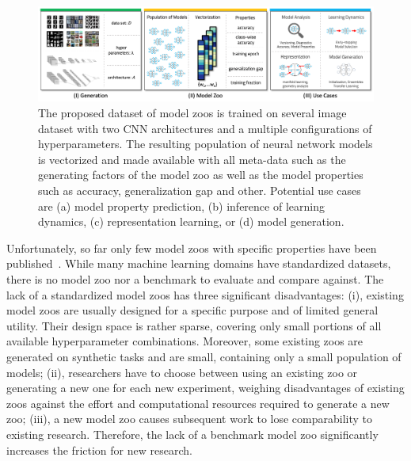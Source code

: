 \begin{figure}[t]
\begin{minipage}[t]{1.0\textwidth}
\begin{center}
\includegraphics[trim=0in 0in 0in 0in, clip, width=1.0\linewidth]{imgs/model_zoo_overview_v2.png}
\vskip -0.1in
\caption{\small The proposed dataset of model zoos is trained on several image dataset with two CNN architectures and a multiple configurations of hyperparameters. The resulting population of neural network models is vectorized and made available with all meta-data such as the generating factors of the model zoo as well as the model properties such as accuracy, generalization gap and other. Potential use cases are (a) model property prediction, (b) inference of learning dynamics, (c) representation learning, or (d) model generation.
}
\label{fig:overview}    
\end{center}
\end{minipage}
\end{figure}


%
%
Unfortunately, so far only few model zoos with specific properties have been published~\citep{unterthinerPredictingNeuralNetwork2020,eilertsenClassifyingClassifierDissecting2020, suchAtariModelZoo2019, schurholtSelfSupervisedRepresentationLearning2021}. While many machine learning domains have standardized datasets, there is no model zoo nor a benchmark to evaluate and compare against.
%
The lack of a standardized model zoos has three significant disadvantages: 
(i), existing model zoos are usually designed for a specific purpose and of limited general utility. Their design space is rather sparse, covering only small portions of all available hyperparameter combinations. 
Moreover, some existing zoos are generated on synthetic tasks and are small, containing only a small population of models; 
(ii), researchers have to choose between using an existing zoo or generating a new one for each new experiment, weighing disadvantages of existing zoos against the effort and computational resources required to generate a new zoo; 
(iii), a new model zoo causes subsequent work to lose comparability to existing research. Therefore, the lack of a benchmark model zoo significantly increases the friction for new research.


